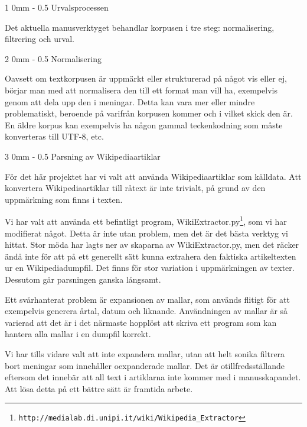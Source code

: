 \documentclass[11pt, a4paper, twoside]{article}
\makeatletter
\renewcommand{\subsubsection}{\@startsection
  {subsubsection}%
  {3}%
  {0mm}%
  {-\baselineskip}%
  {0.5\baselineskip}%
  {\bfseries\sffamily}}%
\renewcommand{\subsection}{\@startsection
  {subsection}%
  {2}%
  {0mm}%
  {-\baselineskip}%
  {0.5\baselineskip}%
  {\bfseries\sffamily\large}}%
\renewcommand{\section}{\@startsection
  {section}%
  {1}%
  {0mm}%
  {-\baselineskip}%
  {0.5\baselineskip}%
  {\bfseries\sffamily\Large}}%
\makeatother
\begin{document}
\section{Urvalsprocessen}

Det aktuella manusverktyget behandlar korpusen i tre steg: normalisering, filtrering och urval.

\subsection{Normalisering}

Oavsett om textkorpusen är uppmärkt eller strukturerad på något vis eller ej, börjar man med att normalisera den till ett format man vill ha, exempelvis genom att dela upp den i meningar. Detta kan vara mer eller mindre problematiskt, beroende på varifrån korpusen kommer och i vilket skick den är. En äldre korpus kan exempelvis ha någon gammal teckenkodning som måste konverteras till UTF-8, etc.

\subsubsection{Parsning av Wikipediaartiklar}

För det här projektet har vi valt att använda Wikipediaartiklar som källdata. Att konvertera Wikipediaartiklar till råtext är inte trivialt, på grund av den uppmärkning som finns i texten.

Vi har valt att använda ett befintligt program, WikiExtractor.py\footnote{\tt http://medialab.di.unipi.it/wiki/Wikipedia\_Extractor}, som vi har modifierat något. Detta är inte utan problem, men det är det bästa verktyg vi hittat. Stor möda har lagts ner av skaparna av WikiExtractor.py, men det räcker ändå inte för att på ett generellt sätt kunna extrahera den faktiska artikeltexten ur en Wikipediadumpfil. Det finns för stor variation i uppmärkningen av texter. Dessutom går parsningen ganska långsamt.

Ett svårhanterat problem är expansionen av mallar, som används flitigt för att exempelvis generera årtal, datum och liknande. Användningen av mallar är så varierad att det är i det närmaste hopplöst att skriva ett program som kan hantera alla mallar i en dumpfil korrekt.


Vi har tills vidare valt att inte expandera mallar, utan att helt sonika filtrera bort meningar som innehåller
oexpanderade mallar. Det är otillfredsställande eftersom det innebär att all text i artiklarna inte kommer med i manusskapandet. Att lösa detta på ett bättre sätt är framtida arbete.
\end{document}
